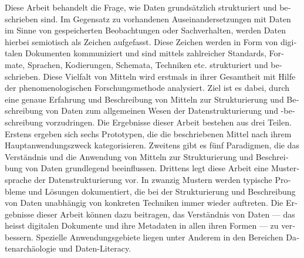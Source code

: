 \begin{otherlanguage}{ngerman}




Diese Arbeit behandelt die Frage, wie Daten grundsätzlich strukturiert und
beschrieben sind. Im Gegensatz zu vorhandenen Auseinandersetzungen mit Daten im
Sinne von gespeicherten Beobachtungen oder Sachverhalten, werden Daten hierbei
semiotisch als Zeichen aufgefasst. Diese Zeichen werden in Form von digitalen
Dokumenten kommuniziert und sind mittels zahlreicher Standards, Formate,
Sprachen, Kodierungen, Schemata, Techniken etc. strukturiert und beschrieben.
Diese Vielfalt von Mitteln wird erstmals in ihrer Gesamtheit mit Hilfe der
phenomenologischen Forschungsmethode analysiert. Ziel ist es dabei, durch eine
genaue Erfahrung und Beschreibung von Mitteln zur Strukturierung und
Beschreibung von Daten zum allgemeinen Wesen der Datenstrukturierung und
-beschreibung vorzudringen. Die Ergebnisse dieser Arbeit bestehen aus drei
Teilen. Erstens ergeben sich sechs Prototypen, die die beschriebenen Mittel
nach ihrem Hauptanwendungszweck kategorisieren. Zweitens gibt es fünf
Paradigmen, die das Verständnis und die Anwendung von Mitteln zur
Strukturierung und Beschreibung von Daten grundlegend beeinflussen. Drittens
legt diese Arbeit eine Mustersprache der Datenstrukturierung vor. In zwanzig
Mustern werden typische Probleme und Lösungen dokumentiert, die bei der
Strukturierung und Beschreibung von Daten unabhängig von konkreten Techniken
immer wieder auftreten. Die Ergebnisse dieser Arbeit können dazu beitragen, das
Verständnis von Daten --- das heisst digitalen Dokumente und ihre Metadaten in
allen ihren Formen --- zu verbessern. Spezielle Anwendungsgebiete liegen unter
Anderem in den Bereichen Datenarchäologie und Daten-Literacy.

\end{otherlanguage}
\cleardoublepage

\tableofcontents

\begingroup
\let\cleardoublepage\relax
\let\clearpage\relax
\makeatletter\renewcommand*{\float@listhead}[1]{\unnumberedsection{#1}}\makeatother
{}
\listoffigures
\listoftables
\endgroup

